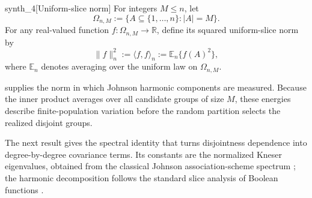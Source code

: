 \begin{definitionv}{synth_4}[Uniform-slice norm]
For integers \(M \le n\), let
\[
\Omega_{n,M}:=\{A\subseteq \{1,\ldots,n\}: |A|=M\}.
\]
For any real-valued function \(f:\Omega_{n,M}\to\mathbb R\), define its squared uniform-slice norm by
\[
\|f\|_n^2
:=
\langle f,f\rangle_n
:=
\mathbb E_n\{f(A)^2\},
\]
where \(\mathbb E_n\) denotes averaging over the uniform law on \(\Omega_{n,M}\).
\end{definitionv}

 supplies the norm in which Johnson harmonic components are measured. Because the inner product averages over all candidate groups of size \(M\), these energies describe finite-population variation before the random partition selects the realized disjoint groups.

The next result gives the spectral identity that turns disjointness dependence into degree-by-degree covariance terms. Its constants are the normalized Kneser eigenvalues, obtained from the classical Johnson association-scheme spectrum \citep{Delsarte1973,BrouwerCohenNeumaier1989,BrouwerEtAl2018}; the harmonic decomposition follows the standard slice analysis of Boolean functions \citep{Filmus2016}.

